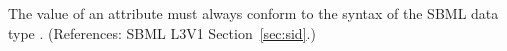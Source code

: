 The value of an  attribute must always conform to the syntax of
the SBML data type .  (References: SBML L3V1
Section~\ref{sec:sid}.)
